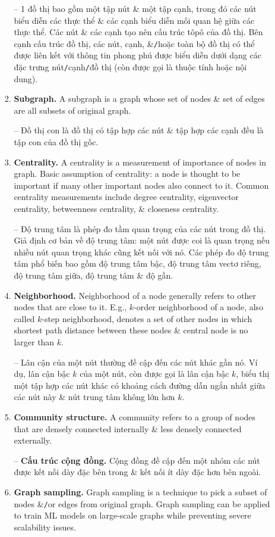 \documentclass{article}
\begin{document}
\begin{itemize}
\begin{itemize}
\begin{enumerate}
            -- 1 đồ thị bao gồm một tập nút \& một tập cạnh, trong đó các nút biểu diễn các thực thể \& các cạnh biểu diễn mối quan hệ giữa các thực thể. Các nút \& các cạnh tạo nên cấu trúc tôpô của đồ thị. Bên cạnh cấu trúc đồ thị, các nút, cạnh, \&{\tt/}hoặc toàn bộ đồ thị có thể được liên kết với thông tin phong phú được biểu diễn dưới dạng các đặc trưng nút{\tt/}cạnh{\tt/}đồ thị (còn được gọi là thuộc tính hoặc nội dung).
            \item {\bf Subgraph.} A subgraph is a graph whose set of nodes \& set of edges are all subsets of original graph.

            -- Đồ thị con là đồ thị có tập hợp các nút \& tập hợp các cạnh đều là tập con của đồ thị gốc.
            \item {\bf Centrality.} A centrality is a measurement of importance of nodes in graph. Basic assumption of centrality: a node is thought to be important if many other important nodes also connect to it. Common centrality measurements include degree centrality, eigenvector centrality, betweenness centrality, \& closeness centrality.

            -- Độ trung tâm là phép đo tầm quan trọng của các nút trong đồ thị. Giả định cơ bản về độ trung tâm: một nút được coi là quan trọng nếu nhiều nút quan trọng khác cũng kết nối với nó. Các phép đo độ trung tâm phổ biến bao gồm độ trung tâm bậc, độ trung tâm vectơ riêng, độ trung tâm giữa, độ trung tâm \& độ gần.
            \item {\bf Neighborhood.} Neighborhood of a node generally refers to other nodes that are close to it. E.g., $k$-order neighborhood of a node, also called $k$-step neighborhood, denotes a set of other nodes in which shortest path distance between these nodes \& central node is no larger than $k$.

            -- Lân cận của một nút thường đề cập đến các nút khác gần nó. Ví dụ, lân cận bậc $k$ của một nút, còn được gọi là lân cận bậc $k$, biểu thị một tập hợp các nút khác có khoảng cách đường dẫn ngắn nhất giữa các nút này \& nút trung tâm không lớn hơn $k$.
            \item {\bf Community structure.} A community refers to a group of nodes that are densely connected internally \& less densely connected externally.

            -- {\bf Cấu trúc cộng đồng.} Cộng đồng đề cập đến một nhóm các nút được kết nối dày đặc bên trong \& kết nối ít dày đặc hơn bên ngoài.
            \item {\bf Graph sampling.} Graph sampling is a technique to pick a subset of nodes \&{\tt/}or edges from original graph. Graph sampling can be applied to train ML models on large-scale graphs while preventing severe scalability issues.


\end{enumerate}
\end{itemize}
\end{itemize}
\end{document}
